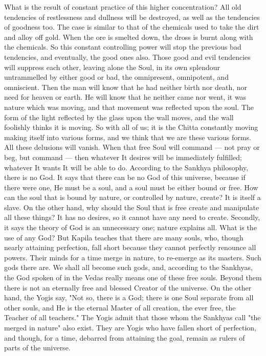 What is the result of constant practice of this higher
concentration? All old tendencies of restlessness and dullness will be
destroyed, as well as the tendencies of goodness too. The case is
similar to that of the chemicals used to take the dirt and alloy off
gold. When the ore is smelted down, the dross is burnt along with the
chemicals. So this constant controlling power will stop the previous
bad tendencies, and eventually, the good ones also. Those good and evil
tendencies will suppress each other, leaving alone the Soul, in its own
splendour untrammelled by either good or bad, the omnipresent,
omnipotent, and omniscient. Then the man will know that he had neither
birth nor death, nor need for
heaven or earth. He will know that he neither came nor went, it was
nature which was moving, and that movement was reflected upon the soul.
The form of the light reflected by the glass upon the wall moves, and
the wall foolishly thinks it is moving. So with all of us; it is the
Chitta constantly moving making itself into various forms, and we think
that we are these various forms. All these delusions will vanish. When
that free Soul will command — not pray or beg, but command — then
whatever It desires will be immediately fulfilled; whatever It wants It
will be able to do. According to the Sankhya philosophy, there is no
God. It says that there can be no God of this universe, because if
there were one, He must be a soul, and a soul must be either bound or
free. How can the soul that is bound by nature, or controlled by
nature, create? It is itself a slave. On the other hand, why should the
Soul that is free create and manipulate all these things? It has no
desires, so it cannot have any need to create. Secondly, it says the
theory of God is an unnecessary one; nature explains all. What is the
use of any God? But Kapila teaches that there are many souls, who,
though nearly attaining perfection, fall short because they cannot
perfectly renounce all powers. Their minds for a time merge in nature,
to re-emerge as its masters. Such gods there are. We shall all become
such gods, and, according to the Sankhyas, the God spoken of in the
Vedas really means one of these free souls. Beyond them there is not an
eternally free and blessed Creator of the universe. On the other hand,
the Yogis say, "Not so, there is a God; there is one Soul separate from
all other souls, and He is the eternal Master of all creation, the ever
free, the Teacher of all teachers." The Yogis admit that those whom the
Sankhyas call "the merged in nature" also exist. They are Yogis who
have fallen short of perfection, and though, for a time, debarred from
attaining the goal, remain as rulers of parts of the universe. \\

